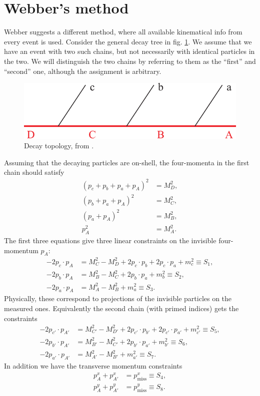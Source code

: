 \documentclass[twoside,english]{uiofysmaster}
\begin{document}
\section{Webber's method}
Webber \cite{Webber:2009vm} suggests a different method, where all available kinematical info from every event is used. Consider the general decay tree in fig. \ref{fig:decaytree}. We assume that we have an event with two such chains, but not necessarily with identical particles in the two. We will distinguish the two chains by referring to them as the ``first'' and ``second'' one, although the assignment is arbitrary.
\begin{figure}[hbt]
\centering
\includegraphics[scale=0.7]{figures/fig-chain.pdf} %
\caption{Decay topology, from \cite{Miller:2005zp}.}
\label{fig:decaytree}
\end{figure}
Assuming that the decaying particles are on-shell, the four-momenta in the first chain should satisfy
\begin{align}
	(p_c + p_b + p_a + p_A)^2 &= M_D^2,\nonumber \\
	(p_b + p_a + p_A)^2 &= M_C^2,\nonumber \\
	(p_a + p_A)^2 &= M_B^2,\label{eq:constraints}\\
	p_A^2 &= M_A^2.\nonumber
\end{align}
The first three equations give three linear constraints on the invisible four-momentum $p_A$:
\begin{align}
	-2p_c\cdot p_A &= M_C^2 - M_D^2 + 2p_c\cdot p_b + 2p_c \cdot p_a + m_c^2 \equiv S_1,\label{eq:constraints_projections1} \\
	-2p_b\cdot p_A &= M_B^2 - M_C^2 + 2p_b\cdot p_a + m_b^2 \equiv S_2,\\
	-2p_a\cdot p_A &= M_A^2 - M_B^2 + m_a^2 \equiv S_3.
\end{align}
Physically, these correspond to projections of the invisible particles on the measured ones. Equivalently the second chain (with primed indices) gets the constraints
\begin{align}
	-2p_{c'}\cdot p_{A'} &= M_{C'}^2 - M_{D'}^2 + 2p_{c'}\cdot p_{b'} + 2p_{c'} \cdot p_{a'} + m_{c'}^2 \equiv S_5, \\ 
	-2p_{b'}\cdot p_{A'} &= M_{B'}^2 - M_{C'}^2 + 2p_{b'}\cdot p_{a'} + m_{b'}^2 \equiv S_6,\\
	-2p_{a'}\cdot p_{A'} &= M_{A'}^2 - M_{B'}^2 + m_{a'}^2 \equiv S_7.\label{eq:constraints_projections6}
\end{align}
In addition we have the transverse momentum constraints
\begin{align}
	p_A^x + p_{A'}^x &= p_\mathrm{miss}^x \equiv S_4, \label{eq:Svec_orig} \\
	p_A^y + p_{A'}^y &= p_\mathrm{miss}^y \equiv S_8. \nonumber
\end{align}
\end{document}
